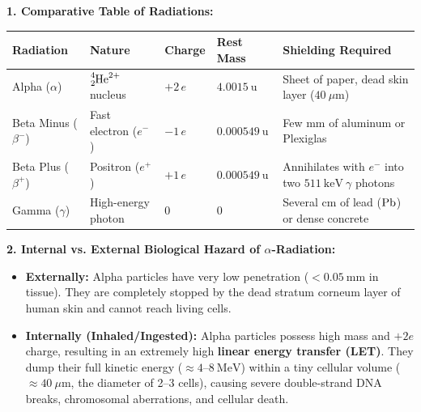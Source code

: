 \begin{solution}
\textbf{1. Comparative Table of Radiations:}
\begin{center}
\renewcommand{\arraystretch}{1.3}
\begin{tabular}{@{}p{2.3cm}p{3.1cm}p{1.8cm}p{2.3cm}p{5.5cm}@{}}
\toprule
\textbf{Radiation} & \textbf{Nature} & \textbf{Charge} & \textbf{Rest Mass} & \textbf{Shielding Required} \\
\midrule
Alpha ($\alpha$) & $\ce{^{4}_{2}He}^{2+}$ nucleus & $+2\,e$ & $4.0015\ \mathrm{u}$ & Sheet of paper, dead skin layer ($40\ \mu\mathrm{m}$) \\
Beta Minus ($\beta^-$) & Fast electron ($e^-$) & $-1\,e$ & $0.000549\ \mathrm{u}$ & Few mm of aluminum or Plexiglas \\
Beta Plus ($\beta^+$) & Positron ($e^+$) & $+1\,e$ & $0.000549\ \mathrm{u}$ & Annihilates with $e^-$ into two $511\ \mathrm{keV}\ \gamma$ photons \\
Gamma ($\gamma$) & High-energy photon & $0$ & $0$ & Several cm of lead ($\ce{Pb}$) or dense concrete \\
\bottomrule
\end{tabular}
\end{center}

\textbf{2. Internal vs. External Biological Hazard of $\alpha$-Radiation:}
\begin{itemize}[leftmargin=1.5em,itemsep=2pt]
  \item \textbf{Externally:} Alpha particles have very low penetration ($< 0.05\ \mathrm{mm}$ in tissue). They are completely stopped by the dead stratum corneum layer of human skin and cannot reach living cells.
  \item \textbf{Internally (Inhaled/Ingested):} Alpha particles possess high mass and $+2e$ charge, resulting in an extremely high \textbf{linear energy transfer (LET)}. They dump their full kinetic energy ($\approx 4\text{--}8\ \mathrm{MeV}$) within a tiny cellular volume ($\approx 40\ \mu\mathrm{m}$, the diameter of 2--3 cells), causing severe double-strand DNA breaks, chromosomal aberrations, and cellular death.
\end{itemize}
\end{solution}

